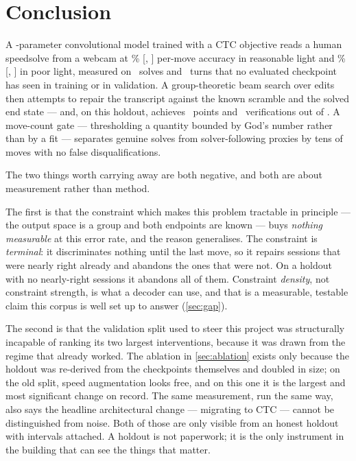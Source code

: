 \section{Conclusion}
\label{sec:conclusion}

A \NParams-parameter convolutional model trained with a CTC objective reads
a human speedsolve from a webcam at \CIDayMean\% [\CIDayLo, \CIDayHi]
per-move accuracy in reasonable light and \CIEveMean\%
[\CIEveLo, \CIEveHi] in poor light, measured on
\NHoldoutSolves\ solves and \NHoldoutMoves\ turns that no evaluated
checkpoint has seen in training or in validation. A group-theoretic beam
search over edits then attempts to repair the transcript against the known
scramble and the solved end state --- and, on this holdout, achieves
\DecodeGain\ points and \DecodeVerified\ verifications out of
\DecodeTrials. A move-count gate --- thresholding a quantity bounded by
God's number rather than by a fit --- separates genuine solves from
solver-following proxies by tens of moves with no false disqualifications.

The two things worth carrying away are both negative, and both are about
measurement rather than method.

The first is that the constraint which makes this problem tractable in
principle --- the output space is a group and both endpoints are known ---
buys \emph{nothing measurable} at this error rate, and the reason
generalises. The constraint is \emph{terminal}: it discriminates nothing
until the last move, so it repairs sessions that were nearly right already
and abandons the ones that were not. On a holdout with no nearly-right
sessions it abandons all of them. Constraint \emph{density}, not constraint
strength, is what a decoder can use, and that is a measurable, testable
claim this corpus is well set up to answer (\cref{sec:gap}).

The second is that the validation split used to steer this project was
structurally incapable of ranking its two largest interventions, because it
was drawn from the regime that already worked. The ablation in
\cref{sec:ablation} exists only because the holdout was re-derived from the
checkpoints themselves and doubled in size; on the old split, speed
augmentation looks free, and on this one it is the largest and most
significant change on record. The same measurement, run the same way, also
says the headline architectural change --- migrating to CTC --- cannot be
distinguished from noise. Both of those are only visible from an honest
holdout with intervals attached. A holdout is not paperwork; it is the only
instrument in the building that can see the things that matter.
